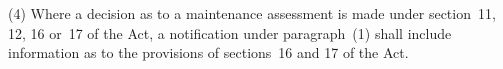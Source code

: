\documentclass[a4paper,12pt]{article}
\begin{document}
%

(4) Where a decision as to a maintenance assessment is made under section~11, 12, 16 or~17 of the Act, a notification under paragraph~(1) shall include information as to the provisions of sections~16 and 17 of the Act.
\end{document}

